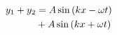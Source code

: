 \begin{equation}
    \begin{split}
        y_1 + y_2 &= A\sin\qty(k x - \omega t) \\
        &+ A\sin\qty(k x + \omega t)
    \end{split}
\end{equation}